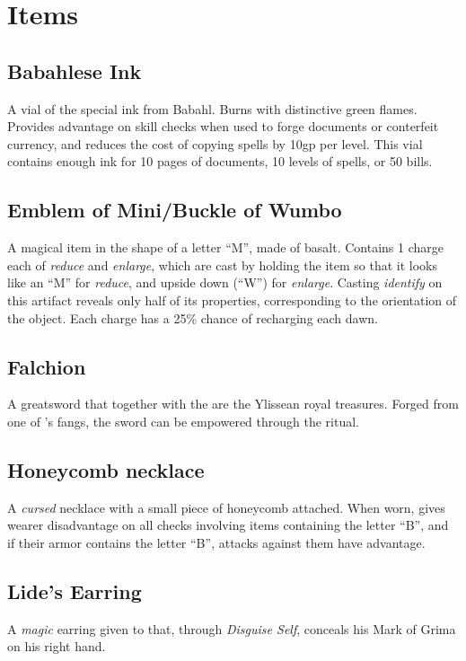 \section{Items}
\subsection{Babahlese Ink}
\label{items:ink}
A vial of the special ink from Babahl. Burns with distinctive green flames. Provides advantage on skill checks when used to forge documents or conterfeit currency, and reduces the cost of copying spells by 10gp per level. This vial contains enough ink for 10 pages of documents, 10 levels of spells, or 50 bills.

\subsection{Emblem of Mini/Buckle of Wumbo}
\label{items:wumbo}
A magical item in the shape of a letter ``M'', made of basalt. Contains 1 charge each of \textit{reduce} and \textit{enlarge}, which are cast by holding the item so that it looks like an ``M'' for \textit{reduce}, and upside down (``W'') for \textit{enlarge}. Casting \textit{identify} on this artifact reveals only half of its properties, corresponding to the orientation of the object. Each charge has a 25\% chance of recharging each dawn.

\subsection{Falchion}
\label{items:falchion}
A greatsword that together with the  are the Ylissean royal treasures. Forged from one of  's fangs, the sword can be empowered through the  ritual.

\subsection{Honeycomb necklace}
\label{items:honeycomb}
A \textit{cursed} necklace with a small piece of honeycomb attached. When worn, gives wearer disadvantage on all checks involving items containing the letter ``B'', and if their armor contains the letter ``B'', attacks against them have advantage. 


\subsection{Lide's Earring}
\label{items:lideearring}
A \textit{magic} earring given to  that, through \textit{Disguise Self}, conceals his Mark of Grima on his right hand.

